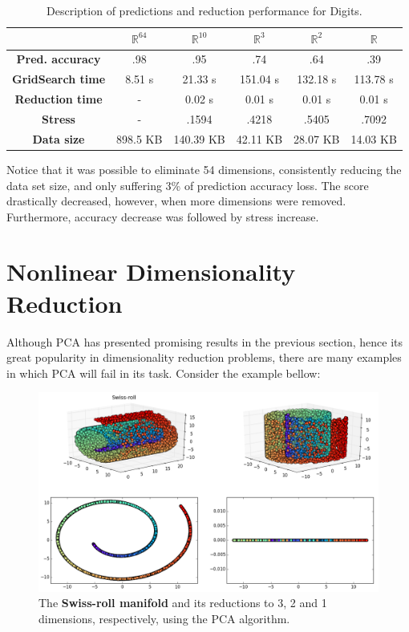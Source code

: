 \documentclass[12pt]{article}
\begin{document}
\begin{table}[H]
	\centering
	\begin{tabular}{|c|c|c|c|c|c|}
		\hline
		& \textbf{$\mathbb{R}^{64}$} & \textbf{$\mathbb{R}^{10}$} & \textbf{$\mathbb{R}^3$} & \textbf{$\mathbb{R}^2$} & \textbf{$\mathbb{R}$} \\\hline
		\textbf{Pred. accuracy}   & .98 & .95 & .74 & .64 & .39 \\\hline
		\textbf{GridSearch time} & 8.51 s & 21.33 s & 151.04 s & 132.18 s & 113.78 s \\\hline
		\textbf{Reduction time} & - & 0.02 s & 0.01 s & 0.01 s & 0.01 s \\\hline
		\textbf{Stress} & - & .1594 & .4218 & .5405 & .7092 \\\hline
		\textbf{Data size} & 898.5 KB & 140.39 KB & 42.11 KB & 28.07 KB & 14.03 KB \\\hline
	\end{tabular}

	\caption{Description of predictions and reduction performance for Digits.}
\end{table}

Notice that it was possible to eliminate 54 dimensions, consistently reducing the data set size, and only suffering 3\% of prediction accuracy loss. The score drastically decreased, however, when more dimensions were removed. Furthermore, accuracy decrease was followed by stress increase.

\newpage
\section{Nonlinear Dimensionality Reduction}

Although PCA has presented promising results in the previous section, hence its great popularity in dimensionality reduction problems, there are many examples in which PCA will fail in its task. Consider the example bellow:

\begin{figure}[H]
	\centering
	\captionsetup{justification=centering}

	\includegraphics[width=\linewidth]{experiments/2_1_swiss_pca}
	\caption{The \textbf{Swiss-roll manifold} and its reductions to 3, 2 and 1 dimensions, respectively, using the PCA algorithm.}
	\label{fig:swiss_pca}
\end{figure}
\end{document}
